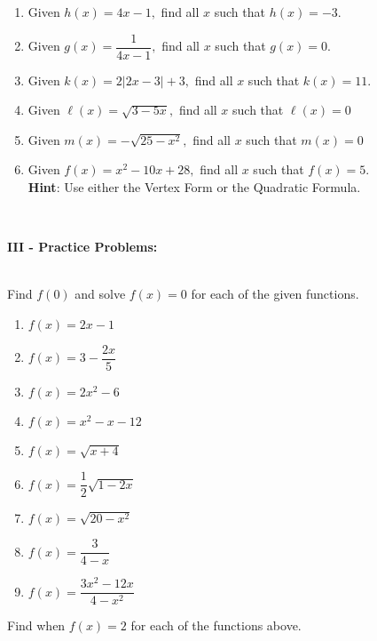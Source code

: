 \documentclass[12pt]{article}
\theoremstyle{definition}
\begin{document}
\begin{enumerate}
	\item Given $h(x)=4x-1,$ find all $x$ such that $h(x)=-3$.\\
	\item Given $g(x)=\dfrac{1}{4x-1},$ find all $x$ such that $g(x)=0$.\\
	\item Given $k(x)=2|2x-3|+3,$ find all $x$ such that $k(x)=11$.\\
	\item Given $\ell(x)=\sqrt{3-5x},$ find all $x$ such that $\ell(x)=0$\\
	\item Given $m(x)=-\sqrt{25-x^2},$ find all $x$ such that $m(x)=0$\\
	\item Given $f(x)=x^2-10x+28,$ find all $x$ such that $f(x)=5$.\\
	{\bf Hint}: Use either the Vertex Form or the Quadratic Formula.
\end{enumerate}
\ \par
{\bf III - Practice Problems:}\\
\ \par
Find $f(0)$ and solve $f(x) = 0$ for each of the given functions.
\begin{center}
\begin{multicols}{2}
\begin{enumerate}
\item $f(x) = 2x - 1$\\
\item $f(x) = 3 - \dfrac{2x}{5}$\\
\item $f(x) = 2x^2 - 6$\\
\item $f(x) = x^2 - x - 12$\\
\item $f(x) = \sqrt{x+4}$\\
\item $f(x) = \dfrac{1}{2}\sqrt{1-2x}$\\
\item $f(x)=\sqrt{20-x^2}$\\
\item $f(x) = \dfrac{3}{4-x}$\\
\item $f(x) = \dfrac{3x^2-12x}{4-x^2}$\\
\end{enumerate}
\end{multicols}
\end{center}
Find when $f(x)=2$ for each of the functions above.
\newpage
\end{document}
